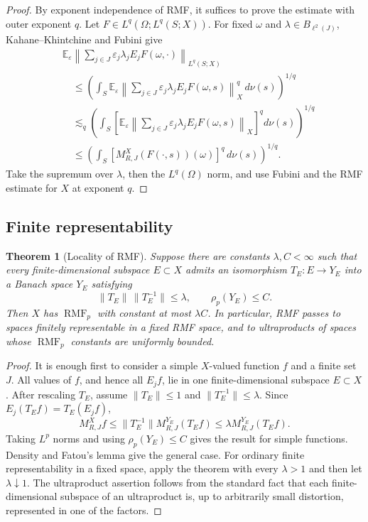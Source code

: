 \documentclass[11pt]{article}
\newtheorem{theorem}{Theorem}[section]
\theoremstyle{definition}
\newcommand{\E}{\mathbb E}
\newcommand{\RMF}{\operatorname{RMF}}
\newcommand{\1}{\mathbf 1}
\newcommand{\eps}{\varepsilon}
\begin{document}
\begin{proof}
By exponent independence of RMF, it suffices to prove the estimate with outer
exponent $q$.  Let $F\in L^q(\Omega;L^q(S;X))$.  For fixed $\omega$ and
$\lambda\in B_{\ell^2(J)}$, Kahane--Khintchine and Fubini give
\begin{align*}
 &\E_\eps\left\|\sum_{j\in J}\eps_j\lambda_jE_jF(\omega,\cdot)
 \right\|_{L^q(S;X)}\\
 &\quad\le
 \left(\int_S\E_\eps
 \left\|\sum_{j\in J}\eps_j\lambda_jE_jF(\omega,s)\right\|_X^q
 \,d\nu(s)\right)^{1/q}\\
 &\quad\lesssim_q
 \left(\int_S
 \left[\E_\eps
 \left\|\sum_{j\in J}\eps_j\lambda_jE_jF(\omega,s)\right\|_X
 \right]^q d\nu(s)\right)^{1/q}\\
 &\quad\le
 \left(\int_S[M_{R,J}^X(F(\cdot,s))(\omega)]^q\,d\nu(s)\right)^{1/q}.
\end{align*}
Take the supremum over $\lambda$, then the $L^q(\Omega)$ norm, and use Fubini
and the RMF estimate for $X$ at exponent $q$.
\end{proof}

\subsection{Finite representability}

\begin{theorem}[Locality of RMF]\label{thm:finite-rep}
Suppose there are constants $\lambda,C<\infty$ such that every
finite-dimensional subspace $E\subset X$ admits an isomorphism
$T_E:E\to Y_E$ into a Banach space $Y_E$ satisfying
\[
 \|T_E\|\,\|T_E^{-1}\|\le\lambda,
 \qquad \rho_p(Y_E)\le C.
\]
Then $X$ has $\RMF_p$ with constant at most $\lambda C$.  In particular, RMF
passes to spaces finitely representable in a fixed RMF space, and to ultraproducts
of spaces whose $\RMF_p$ constants are uniformly bounded.
\end{theorem}

\begin{proof}
It is enough first to consider a simple $X$-valued function $f$ and a finite set
$J$.  All values of $f$, and hence all $E_jf$, lie in one finite-dimensional
subspace $E\subset X$.  After rescaling $T_E$, assume $\|T_E\|\le1$ and
$\|T_E^{-1}\|\le\lambda$.  Since $E_j(T_Ef)=T_E(E_jf)$,
\[
 M_{R,J}^Xf\le \|T_E^{-1}\|M_{R,J}^{Y_E}(T_Ef)
 \le\lambda M_{R,J}^{Y_E}(T_Ef).
\]
Taking $L^p$ norms and using $\rho_p(Y_E)\le C$ gives the result for simple
functions.  Density and Fatou's lemma give the general case.  For ordinary finite
representability in a fixed space, apply the theorem with every $\lambda>1$ and
then let $\lambda\downarrow1$.  The ultraproduct assertion follows from the
standard fact that each finite-dimensional subspace of an ultraproduct is, up to
arbitrarily small distortion, represented in one of the factors.
\end{proof}
\end{document}
